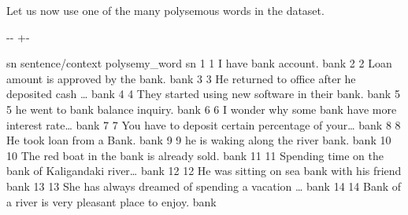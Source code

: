 \documentclass[letterpaper,10pt,english]{sphinxmanual}
\newlength\nbsphinxcodecellspacing
\begin{document}
Let us now use one of the many polysemous words in the dataset.

{
\begin{sphinxVerbatim}[commandchars=\\\{\}]
\llap{\color{nbsphinxin}[7]:\,\hspace{\fboxrule}\hspace{\fboxsep}}
\PYG{p}{[}\PYG{p}{[}\PYG{p}{]} \PYG{p}{]}
\end{sphinxVerbatim}
}

{

\kern-\sphinxverbatimsmallskipamount\kern-\baselineskip
\kern+\FrameHeightAdjust\kern-\fboxrule
\vspace{\nbsphinxcodecellspacing}

\begin{sphinxVerbatim}[commandchars=\\\{\}]
\llap{\color{nbsphinxout}[7]:\,\hspace{\fboxrule}\hspace{\fboxsep}}    sn                                   sentence/context polysemy\_word
sn
1    1                               I have bank account.          bank
2    2               Loan amount is approved by the bank.          bank
3    3  He returned to office after he deposited cash {\ldots}          bank
4    4     They started using new software in their bank.          bank
5    5                   he went to bank balance inquiry.          bank
6    6  I wonder why some bank have more interest rate{\ldots}          bank
7    7  You have to deposit certain percentage of your{\ldots}          bank
8    8                          He took loan from a Bank.          bank
9    9                 he is waking along the river bank.          bank
10  10          The red boat in the bank is already sold.          bank
11  11  Spending time on the bank of Kaligandaki river{\ldots}          bank
12  12         He was sitting on sea bank with his friend          bank
13  13  She has always dreamed of spending a vacation {\ldots}          bank
14  14   Bank of a river is very pleasant place to enjoy.          bank
\end{sphinxVerbatim}
}
\end{document}
